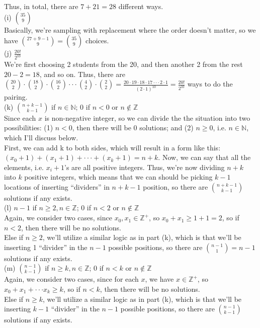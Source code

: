 \documentclass{article}
\begin{document}
Thus, in total, there are $7+21 = 28$ different ways. \\[.5cm]
{\color{red} (i) $\binom{35}{9}$} \\

Basically, we're sampling with replacement where the order doesn't matter, so we have $\binom{27 + 9 - 1}{9} = \binom{35}{9}$ choices. \\[.5cm]
{\color{red} (j) $\frac{20!}{2^{10}}$} \\

We're first choosing 2 students from the 20, and then another 2 from the rest $20-2=18$, and so on. Thus, there are $\binom{20}{2}\cdot\binom{18}{2}\cdot\binom{16}{2}\cdot\cdot\cdot\binom{4}{2}\cdot\binom{2}{2} = \frac{20\cdot19\cdot18\cdot17\cdot\cdot\cdot2\cdot1}{(2\cdot1)^{10}} = \frac{20!}{2^{10}}$ ways to do the pairing. \\[.5cm]
{\color{red} (k) $\binom{n+k-1}{k-1}$ if $n\in\mathbb{N}$; 0 if $n<0$ or $n\not\in\mathbb{Z}$ } \\

Since each $x$ is non-negative integer, so we can divide the the situation into two possibilities: (1) $n<0$, then there will be 0 solutions; and (2) $n\geq0$, i.e. $n\in\mathbb{N}$, which I'll discuss below. \\

First, we can add k to both sides, which will result in a form like this: $(x_0+1)+(x_1+1)+\cdot\cdot\cdot+(x_k+1) = n+k$. Now, we can say that all the elements, i.e. $x_i+1$'s are all positive integers. Thus, we're now dividing $n+k$ into $k$ positive integers, which means that we can should be picking $k-1$ locations of inserting ``dividers'' in $n+k-1$ position, so there are $\binom{n+k-1}{k-1}$ solutions if any exists. \\[.5cm]
{\color{red} (l) $n-1$ if $n\geq2, n\in\mathbb{Z}$; 0 if $n<2$ or $n\not\in\mathbb{Z}$ } \\

Again, we consider two cases, since $x_0,x_1\in\mathbb{Z^+}$, so $x_0+x_1\geq1+1=2$, so if $n<2$, then there will be no solutions. \\

Else if $n\geq2$, we'll utilize a similar logic as in part (k), which is that we'll be inserting 1 ``divider'' in the $n-1$ possible positions, so there are $\binom{n-1}{1} = n-1$ solutions if any exists. \\[.5cm]
{\color{red} (m) $\binom{n-1}{k-1}$ if $n\geq k, n\in\mathbb{Z}$; 0 if $n<k$ or $n\not\in\mathbb{Z}$ } \\

Again, we consider two cases, since for each $x$, we have $x\in\mathbb{Z^+}$, so $x_0+x_1+\cdot\cdot\cdot x_k\geq k$, so if $n<k$, then there will be no solutions. \\

Else if $n\geq k$, we'll utilize a similar logic as in part (k), which is that we'll be inserting $k-1$ ``divider'' in the $n-1$ possible positions, so there are $\binom{n-1}{k-1}$ solutions if any exists.
\end{document}
